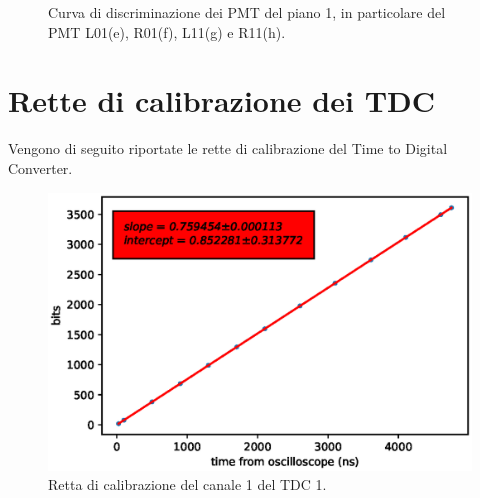 \begin{figure}[H]
\begin{minipage}{.5\textwidth}
		\end{minipage}%
		\begin{minipage}{.5\textwidth}
			\centering
			\quad
		\end{minipage}
    \caption{Curva di discriminazione dei PMT del piano 1, in particolare del PMT L01(e), R01(f), L11(g) e R11(h).}
\end{figure}


\chapter{Rette di calibrazione dei TDC}               %
Vengono di seguito riportate le rette di calibrazione del Time to Digital Converter.

\begin{figure}[H]
  \centering
  \includegraphics[width=.8\textwidth]{plots/tdc11.eps}
  \caption{Retta di calibrazione del canale 1 del TDC 1.}
  \label{fig:tdc11}
\end{figure}

